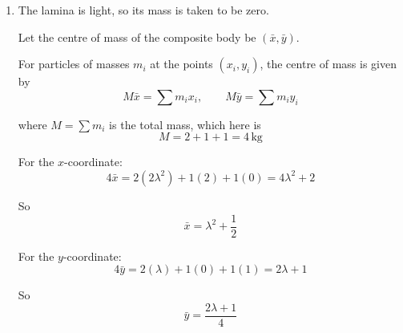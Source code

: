 \documentclass[leqno]{article}
\begin{document}
\begin{enumerate}[
  label=\textbf{\arabic*.},
  leftmargin=*,
  topsep=0pt,
  partopsep=0pt,
  parsep=0pt
]
\begin{djsSolution}
\begin{enumerate}[label=\textbf{(\alph*)}, start=1]
  Substituting into $p-q-3=0$:
  \[
  p-1-3=0\quad\Longrightarrow\quad p=4
  \]

  Now take moments about $O$, with anticlockwise positive, treating the two components of each force separately.

  For the force at $(1,0)$, the $x$-component acts along the $x$-axis, through $O$. The $y$-component, $2q\,\mathrm{N}$ in the positive $y$-direction, acts at a perpendicular distance of $1\,\mathrm{m}$ from $O$, so its moment is anticlockwise.

  For the force at $C$, the $y$-component acts along the $y$-axis, through $O$. The $x$-component, $q\,\mathrm{N}$ in the negative $x$-direction, acts at a perpendicular distance of $1\,\mathrm{m}$ from $O$, so its moment is anticlockwise.

  For the force at $(t,1)$, the $x$-component, $3\,\mathrm{N}$ in the negative $x$-direction, acts at a perpendicular distance of $1\,\mathrm{m}$ from $O$, so its moment is anticlockwise. The $y$-component, $6\,\mathrm{N}$ in the negative $y$-direction, acts at a perpendicular distance of $t\,\mathrm{m}$ from $O$, so its moment is clockwise.

  The forces form an anticlockwise couple of magnitude $3\,\mathrm{N\,m}$, so
  \[
  2q(1)+q(1)+3(1)-6t=3
  \]

  Using $q=1$:
  \[
  2+1+3-6t=3
  \]

  Therefore
  \[
  6-6t=3\quad\Longrightarrow\quad 6t=3\quad\Longrightarrow\quad t=\frac12
  \]

  So
  \[
  p=4, \qquad q=1, \qquad t=\frac12
  \]

  \item The lamina is light, so its mass is taken to be zero.

  Let the centre of mass of the composite body be $(\bar{x},\bar{y})$.

  For particles of masses $m_i$ at the points $(x_i,y_i)$, the centre of mass is given by
  \[
  M\bar{x}=\sum m_ix_i,\qquad M\bar{y}=\sum m_iy_i
  \]

  where $M=\sum m_i$ is the total mass, which here is
  \[
  M=2+1+1=4\,\mathrm{kg}
  \]

  For the $x$-coordinate:
  \[
  4\bar{x}=2(2\lambda^2)+1(2)+1(0)=4\lambda^2+2
  \]

  So
  \[
  \bar{x}=\lambda^2+\frac12
  \]

  For the $y$-coordinate:
  \[
  4\bar{y}=2(\lambda)+1(0)+1(1)=2\lambda+1
  \]

  So
  \[
  \bar{y}=\frac{2\lambda+1}{4}
  \]


\end{enumerate}
\end{djsSolution}
\end{enumerate}
\end{document}
